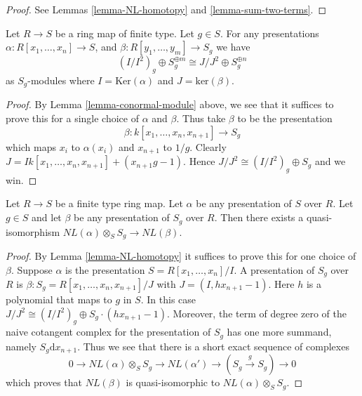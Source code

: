 \begin{proof}
See Lemmas \ref{lemma-NL-homotopy} and \ref{lemma-sum-two-terms}.
\end{proof}

\begin{lemma}
\label{lemma-conormal-module-localize}
Let $R \to S$ be a ring map of finite type.
Let $g \in S$. For any presentations
$\alpha : R[x_1,\ldots,x_n] \to S$, and
$\beta : R[y_1,\ldots,y_m] \to S_g$ we have
$$
(I/I^2)_g \oplus S^{\oplus m}_g \cong J/J^2 \oplus S_g^{\oplus n}
$$
as $S_g$-modules where
$I = \text{Ker}(\alpha)$ and $J = \text{ker}(\beta)$.
\end{lemma}

\begin{proof}
By Lemma \ref{lemma-conormal-module} above, we see that
it suffices to prove this for a single choice of $\alpha$
and $\beta$. Thus take $\beta$ to be the presentation
$$
\beta : k[x_1, \ldots, x_n , x_{n + 1}] \longrightarrow S_g
$$
which maps $x_i$ to $\alpha(x_i)$ and $x_{n + 1}$ to $1/g$.
Clearly $J = Ik[x_1, \ldots, x_n , x_{n + 1}] +
(x_{n + 1}g - 1)$. Hence $J/J^2 \cong (I/I^2)_g \oplus S_g$
and we win.
\end{proof}

\begin{lemma}
\label{lemma-localize-NL}
Let $R \to S$ be a finite type ring map.
Let $\alpha$ be any presentation of $S$ over $R$.
Let $g \in S$ and let $\beta$ be any presentation of $S_g$ over $R$.
Then there exists a quasi-isomorphism
$NL(\alpha)\otimes_S S_g \to NL(\beta)$.
\end{lemma}

\begin{proof}
By Lemma \ref{lemma-NL-homotopy} it suffices to prove this
for one choice of $\beta$. Suppose $\alpha$ is the
presentation $S = R[x_1, \ldots, x_n]/I$.
A presentation of $S_g$ over $R$ is
$\beta : S_g = R[x_1, \ldots, x_n, x_{n + 1}]/J$ with
$J = (I, h x_{n + 1} - 1)$. Here $h$ is a polynomial 
that maps to $g$ in $S$. In this case $J/J^2
\cong (I/I^2)_g \oplus S_g \cdot (h x_{n + 1} - 1)$.
Moreover, the term of degree zero of the naive cotangent complex
for the presentation of $S_g$ has one more summand,
namely $S_g \text{d}x_{n + 1}$. Thus we see that
there is a short exact sequence of complexes
$$
0 \to NL(\alpha) \otimes_S S_g \to NL(\alpha') \to
(S_g \xrightarrow{g} S_g) \to 0
$$
which proves that $NL(\beta)$ is quasi-isomorphic to
$NL(\alpha) \otimes_S S_g$.
\end{proof}







